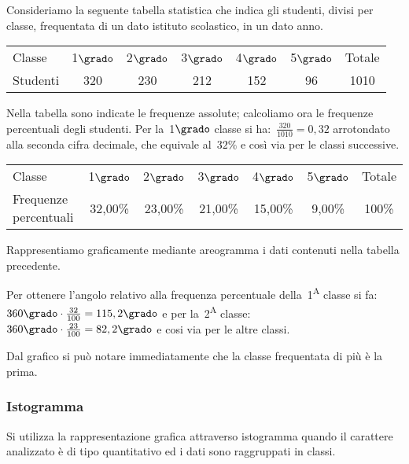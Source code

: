  \begin{esempio}
Consideriamo la seguente tabella statistica che indica gli studenti, divisi 
per classe, frequentata di un dato istituto scolastico, in un dato anno.

\begin{center}
\begin{tabular}{lcccccc}
\toprule
Classe & 1$\grado$ &2$\grado$ &3$\grado$ & 4$\grado$ &5$\grado$ &Totale\\
Studenti & 320 & 230 & 212 & 152 & 96 & 1010 \\
\bottomrule
\end{tabular}
\end{center}

Nella tabella sono indicate le frequenze assolute; calcoliamo ora le 
frequenze percentuali degli studenti.
Per la~1$\grado$ classe si ha:~$\frac{320}{1010}=0,32$ arrotondato alla 
seconda cifra decimale, che equivale al~$32\%$ e così via per le classi 
successive.

\begin{center}
\begin{tabular}{lcccccc}
\toprule
Classe & 1$\grado$ & 2$\grado$ & 3$\grado$ & 4$\grado$ & 5$\grado$ & Totale 
\\
 Frequenze percentuali& 32,00\% & 23,00\% & 21,00\% & 15,00\% & 9,00\% & 
100\% \\
\bottomrule
\end{tabular}
\end{center}

Rappresentiamo graficamente mediante areogramma i dati contenuti nella 
tabella precedente.
\begin{center}
 
\end{center}
Per ottenere l'angolo relativo alla frequenza percentuale 
della~1\textsuperscript{A} 
classe si fa:~$360\grado \cdot \frac{32}{100}=115,2\grado$ e per 
la~2\textsuperscript{A} classe:~$360\grado \cdot \frac{23}{100}=82,2\grado$ e 
cosi via per le altre classi.

Dal grafico si può notare immediatamente che la classe frequentata di più è 
la prima.

 \end{esempio}

\subsubsection{Istogramma}
Si utilizza la rappresentazione grafica attraverso istogramma quando il 
carattere analizzato è di tipo quantitativo ed i dati sono raggruppati in 
classi.

